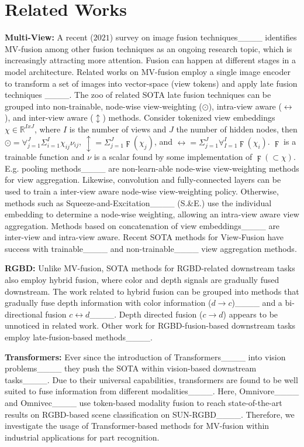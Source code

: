 \section{Related Works}
\textbf{Multi-View:} A recent ($2021$) survey on image fusion techniques____ identifies MV-fusion among other fusion techniques as an ongoing research topic, which is increasingly attracting more attention. Fusion can happen at different stages in a model architecture. Related works on MV-fusion employ a single image encoder to transform a set of images into vector-space (view tokens) and apply late fusion techniques ____. The zoo of related SOTA late fusion techniques can be grouped into non-trainable, node-wise view-weighting ($\odot$), intra-view aware ($\leftrightarrow$), and inter-view aware ($\updownarrow$) methods. Consider tokenized view embeddings $\chi \in \mathbb{R}^{IxJ}$, where $I$ is the number of views and $J$ the number of hidden nodes, then $\odot = \forall_{j=1}^{J} \Sigma_{i=1}^{I} \chi_{ij}\nu_{ij}$, $\updownarrow = \Sigma_{j=1}^{J} \digamma(\chi_j)$, and $\leftrightarrow = \Sigma_{j=1}^{J} \forall_{I=1}^{I} \digamma(\chi_i)$. $\digamma$ is a trainable function and $\nu$ is a scalar found by some implementation of $\digamma(\subset \chi)$. E.g. pooling methods____ are non-learn-able node-wise view-weighting methods for view aggregation. Likewise, convolution and fully-connected layers can be used to train a inter-view aware node-wise view-weighting policy. Otherwise, methods such as Squeeze-and-Excitation____ (S.\&E.) use the individual embedding to determine a node-wise weighting, allowing an intra-view aware view aggregation. Methods based on concatenation of view embeddings____ are inter-view and intra-view aware. Recent SOTA methods for View-Fusion have success with trainable____ and non-trainable____ view aggregation methods.

\textbf{RGBD:} Unlike MV-fusion, SOTA methods for RGBD-related downstream tasks also employ hybrid fusion, where color and depth signals are gradually fused downstream. The work related to hybrid fusion can be grouped into methods that gradually fuse depth information with color information ($d \rightarrow c$)____ and a bi-directional fusion $c \leftrightarrow d$____. Depth directed fusion ($c\to d$) appears to be unnoticed in related work. Other work for RGBD-fusion-based downstream tasks employ late-fusion-based methods____. 

\textbf{Transformers:} Ever since the introduction of Transformers____ into vision problems____ they push the SOTA within vision-based downstream tasks____. Due to their universal capabilities, transformers are found to be well suited to fuse information from different modalities____. Here, Omnivore____ and Omnivec____ use token-based modality fusion to reach state-of-the-art results on RGBD-based scene classification on SUN-RGBD____. Therefore, we investigate the usage of Transformer-based methods for MV-fusion within industrial applications for part recognition. 

